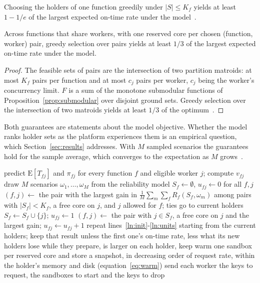 \begin{corollary}
\label{cor:greedy}
Choosing the holders of one function greedily under $|S| \le K_f$ yields at least $1 - 1/e$ of the largest expected
on-time rate under the model~\cite{nemhauser1978}.
\end{corollary}

\begin{proposition}
\label{prop:shared}
Across functions that share workers, with one reserved core per chosen (function, worker) pair, greedy selection
over pairs yields at least $1/3$ of the largest expected on-time rate under the model.
\end{proposition}
\begin{proof}
The feasible sets of pairs are the intersection of two partition matroids: at most $K_f$ pairs per function and at
most $c_j$ pairs per worker, $c_j$ being the worker's concurrency limit. $F$ is a sum of the monotone submodular
functions of Proposition~\ref{prop:submodular} over disjoint ground sets. Greedy selection over the intersection of
two matroids yields at least $1/3$ of the optimum~\cite{fisher1978}.
\end{proof}

Both guarantees are statements about the model objective. Whether the model ranks holder sets as the platform
experiences them is an empirical question, which Section~\ref{sec:results} addresses. With $M$ sampled scenarios the
guarantees hold for the sample average, which converges to the expectation as $M$
grows~\cite{kleywegt2002saa}.

\begin{algorithm}[t]
\caption{Provisioning}
\label{alg:prov}
\small
\begin{algorithmic}[1]
\State predict $\mathrm{E}[T_{fj}]$ and $\pi_{fj}$ for every function $f$ and eligible worker $j$; compute $v_{fj}$
\State draw $M$ scenarios $\omega_1,\dots,\omega_M$ from the reliability model
\State $S_f \gets \emptyset$, $u_{fj} \gets 0$ for all $f, j$ \label{ln:init}
\Repeat {}
  \State $(f,j) \gets$ the pair with the largest gain in $\frac{1}{M}\sum_m \sum_f R_f(S_f,\omega_m)$ among pairs with
         $|S_f| < K_f$, a free core on $j$, and $j$ allowed for $f$; ties go to current holders
  \State $S_f \gets S_f \cup \{j\}$; $u_{fj} \gets 1$
\Repeat {}
  \State $(f,j) \gets$ the pair with $j \in S_f$, a free core on $j$ and the largest gain; $u_{fj} \gets u_{fj} + 1$
 \label{ln:units}
\State repeat lines~\ref{ln:init}-\ref{ln:units} starting from the current holders; keep that result unless the
       first one's on-time rate, less what its new holders lose while they prepare, is larger \label{ln:swap}
\State on each holder, keep warm one sandbox per reserved core and store a snapshot, in decreasing order of
       request rate, within the holder's memory and disk (equation~\eqref{eq:warm}) \label{ln:warm}
\State send each worker the keys to request, the sandboxes to start and the keys to drop
\end{algorithmic}
\end{algorithm}

